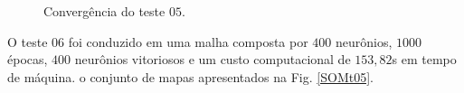 \begin{figure}[H]
	\centering
	\setlength{\fboxsep}{8pt}
	\setlength{\fboxrule}{0.1pt}
	\caption{Convergência do teste $05$.}
	\label{Conv05}
\end{figure} 


O teste $06$ foi conduzido em uma malha composta por $400$ neurônios, $1000$ épocas, $400$ neurônios vitoriosos e um custo computacional de $153,82$s em tempo de máquina. o conjunto de mapas apresentados na Fig. \ref{SOMt05}.


